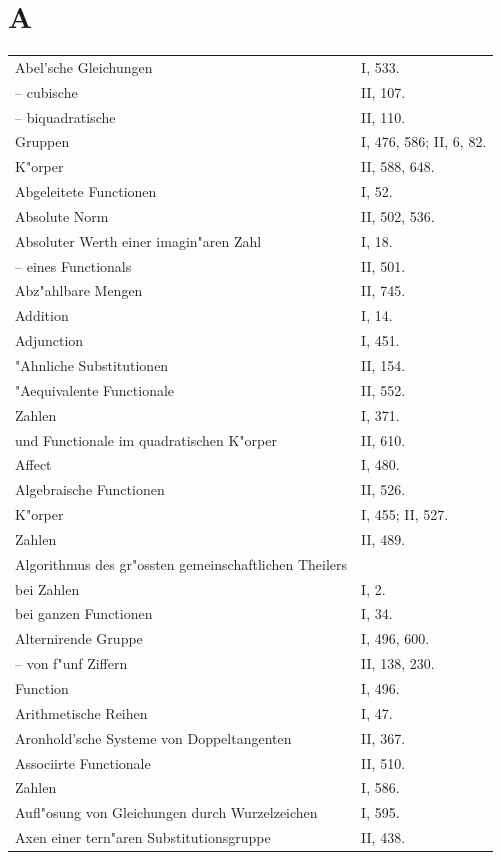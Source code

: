 \documentclass[10pt,a4paper]{article}
\theoremstyle{weberstyle}
\begin{document}
\section*{A}
\begin{flushleft}
\begin{tabular}{@{}p{8cm}l@{}}
Abel'sche Gleichungen & I, 533.\\
\quad -- \quad cubische & II, 107.\\
\quad -- \quad biquadratische & II, 110.\\
\quad Gruppen & I, 476, 586; II, 6, 82.\\
\quad K"orper & II, 588, 648.\\[4pt]
Abgeleitete Functionen & I, 52.\\[4pt]
Absolute Norm & II, 502, 536.\\[4pt]
Absoluter Werth einer imagin"aren Zahl & I, 18.\\
\quad -- \quad eines Functionals & II, 501.\\[4pt]
Abz"ahlbare Mengen & II, 745.\\[4pt]
Addition & I, 14.\\[4pt]
Adjunction & I, 451.\\[4pt]
"Ahnliche Substitutionen & II, 154.\\[4pt]
"Aequivalente Functionale & II, 552.\\
\quad Zahlen & I, 371.\\
\quad und Functionale im quadratischen K"orper & II, 610.\\[4pt]
Affect & I, 480.\\[4pt]
Algebraische Functionen & II, 526.\\
\quad K"orper & I, 455; II, 527.\\
\quad Zahlen & II, 489.\\[4pt]
Algorithmus des gr"ossten gemeinschaftlichen Theilers\\
\quad bei Zahlen & I, 2.\\
\quad bei ganzen Functionen & I, 34.\\[4pt]
Alternirende Gruppe & I, 496, 600.\\
\quad -- \quad von f"unf Ziffern & II, 138, 230.\\
\quad Function & I, 496.\\[4pt]
Arithmetische Reihen & I, 47.\\[4pt]
Aronhold'sche Systeme von Doppeltangenten & II, 367.\\[4pt]
Associirte Functionale & II, 510.\\
\quad Zahlen & I, 586.\\[4pt]
Aufl"osung von Gleichungen durch Wurzelzeichen & I, 595.\\[4pt]
Axen einer tern"aren Substitutionsgruppe & II, 438.
\end{tabular}
\end{flushleft}
\end{document}
